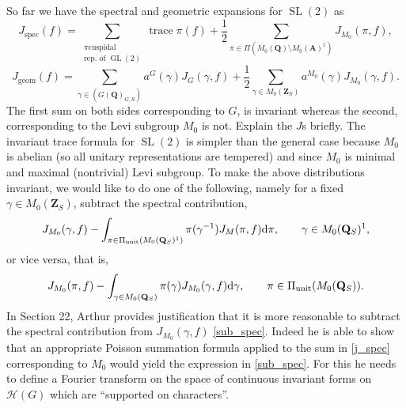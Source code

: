 \documentclass[11pt]{amsart}
\def\A{\mathbf A}
\def\Q{\mathbf Q}
\def\Z{\mathbf Z}
\def\HHH{\mathcal H}
\def\cb#1{{\color{blue}#1}}
\def\d{\text d}
\def\bs{\setminus} 			%
\def\gl{\operatorname{GL}}
\def\sl{\operatorname{SL}}
\def\trace{\operatorname{trace}}
\theoremstyle{remark}
\begin{document}
\cb{
So far we have the spectral and geometric expansions for $\sl(2)$ as
\begin{equation} \label{j_spec}
	J_{\text{spec}}(f) = \sum_{\substack{\pi \text{cuspidal} \\ \text{rep. of } \gl(2)}} \trace \pi(f) + \frac{1}{2} \sum_{\pi \in \Pi(M_0(\Q) \bs M_0(\A)^1)} J_{M_0}(\pi, f), 
\end{equation}
\begin{equation} \label{j_geom}
	J_{\text{geom}}(f) = \sum_{\gamma \in (G(\Q)_{G, S})} a^G(\gamma) J_G(\gamma, f) + \frac{1}{2} \sum_{\gamma \in M_0(\Z_S)} a^{M_0}(\gamma) J_{M_0}(\gamma, f). 
\end{equation}
The first sum on both sides corresponding to $G$, is invariant whereas the second, corresponding to the Levi subgroup $M_0$ is not. {\color{red} Explain the $J$s briefly.} The invariant trace formula for $\sl(2)$ is simpler than the general case because $M_0$ is abelian (so all unitary representations are tempered) and since $M_0$ is minimal and maximal (nontrivial) Levi subgroup. To make the above distributions invariant, we would like to do one of the following, namely for a fixed $\gamma \in M_0(\Z_S)$, subtract the spectral contribution, 
\begin{equation} \label{sub_spec}
J_{M_0}(\gamma, f) - \int_{\pi \in \Pi_{\text{unit}}(M_0(\Q_S)^1)} \pi(\gamma^{-1}) J_M(\pi, f) \d \pi, \qquad \gamma \in M_0(\Q_S)^1,
\end{equation}
or vice versa, that is, 
\[ J_{M_0}(\pi, f) - \int_{\gamma \in M_0(\Q_S)} \pi(\gamma) J_{M_0}(\gamma, f) \d \gamma, \qquad \pi \in \Pi_{\text{unit}}(M_0(\Q_S)). \]
}
In Section 22, Arthur provides justification that it is more reasonable to subtract the spectral contribution from $J_{M_0}(\gamma, f)$ \cref{sub_spec}. Indeed he is able to show that an appropriate Poisson summation formula applied to the sum in \cref{j_spec} corresponding to $M_0$ would yield the expression in \cref{sub_spec}. For this he needs to define a Fourier transform on the space of continuous invariant forms on $\HHH(G)$ which are ``supported on characters''. 
\end{document}
